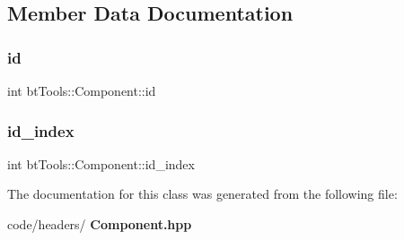 \subsection{Member Data Documentation}
\mbox{\label{classbt_tools_1_1_component_ab7a55e4f14ea155c17d61bb27eb68abc}} 
\subsubsection{id}
{\footnotesize\ttfamily int bt\+Tools\+::\+Component\+::id}

\mbox{\label{classbt_tools_1_1_component_a338b1e55f4dd8251d45dd99f51b8954e}} 
\subsubsection{id\_index}
{\footnotesize\ttfamily int bt\+Tools\+::\+Component\+::id\+\_\+index\hspace{0.3cm}{\ttfamily [static]}}



The documentation for this class was generated from the following file\+:\begin{DoxyCompactItemize}
\item 
code/headers/\textbf{ Component.\+hpp}\end{DoxyCompactItemize}
